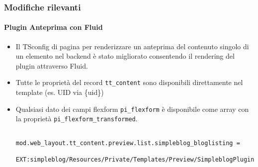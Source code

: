 \begin{frame}[fragile]
	\frametitle{Modifiche rilevanti}
	\framesubtitle{Plugin Anteprima con Fluid}

	\lstset{basicstyle=\tiny\ttfamily}

	\begin{itemize}
		\item Il TSconfig di pagina per renderizzare un anteprima del contenuto singolo di un elemento nel backend è stato migliorato
			consentendo il rendering del plugin attraverso Fluid.

		\item Tutte le proprietà del record \texttt{tt\_content} sono disponibili direttamente nel template (es. UID via \{uid\})

		\item Qualsiasi dato dei campi flexform \texttt{pi\_flexform} è disponibile come array con la proprietà
			\texttt{pi\_flexform\_transformed}.

			\begin{lstlisting}
				mod.web_layout.tt_content.preview.list.simpleblog_bloglisting =
				  EXT:simpleblog/Resources/Private/Templates/Preview/SimpleblogPlugin.html
			\end{lstlisting}

	\end{itemize}

\end{frame}


